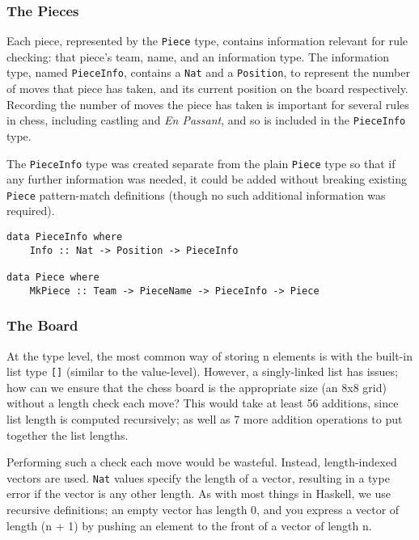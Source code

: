 \documentclass[12pt, a4paper, bibliography=totocnumbered]{scrartcl}
\begin{document}
\subsubsection{The Pieces}

Each piece, represented by the \lstinline{Piece} type, contains information relevant for rule checking: that piece's team, name, and an information type. The information type, named \lstinline{PieceInfo}, contains a \lstinline{Nat} and a \lstinline{Position}, to represent the number of moves that piece has taken, and its current position on the board respectively. Recording the number of moves the piece has taken is important for several rules in chess, including castling and \textit{En Passant}, and so is included in the \lstinline{PieceInfo} type.

The \lstinline{PieceInfo} type was created separate from the plain \lstinline{Piece} type so that if any further information was needed, it could be added without breaking existing \lstinline{Piece} pattern-match definitions (though no such additional information was required).

\begin{lstlisting}
data PieceInfo where
    Info :: Nat -> Position -> PieceInfo

data Piece where
    MkPiece :: Team -> PieceName -> PieceInfo -> Piece
\end{lstlisting}

\subsubsection{The Board}

At the type level, the most common way of storing n elements is with the built-in list type \lstinline{[]} (similar to the value-level). However, a singly-linked list has issues; how can we ensure that the chess board is the appropriate size (an 8x8 grid) without a length check each move? This would take at least 56 additions, since list length is computed recursively; as well as 7 more addition operations to put together the list lengths.

Performing such a check each move would be wasteful. Instead, length-indexed vectors are used. \lstinline{Nat} values specify the length of a vector, resulting in a type error if the vector is any other length. As with most things in Haskell, we use recursive definitions; an empty vector has length 0, and you express a vector of length (n + 1) by pushing an element to the front of a vector of length n.
\end{document}
